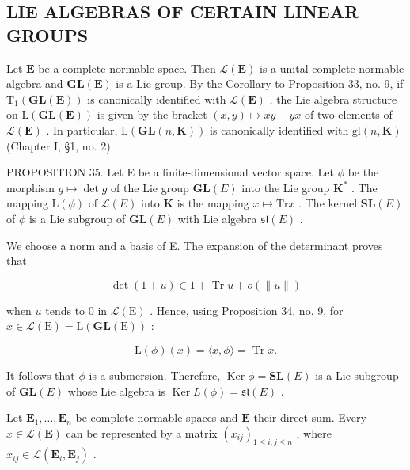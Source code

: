 \subsection{LIE ALGEBRAS OF CERTAIN LINEAR GROUPS}

Let \(\mathbf{E}\) be a complete normable space. Then \(\mathcal{L}(\mathbf{E})\) is a unital complete normable algebra and \(\mathbf{GL}(\mathbf{E})\) is a Lie group. By the Corollary to Proposition 33, no. 9, if \(\mathrm{T}_{1}(\mathbf{GL}(\mathbf{E}))\) is canonically identified with \(\mathcal{L}(\mathbf{E})\) , the Lie algebra structure on \(\mathrm{L}(\mathbf{GL}(\mathbf{E}))\) is given by the bracket \((x,y)\mapsto xy - yx\) of two elements of \(\mathcal{L}(\mathbf{E})\) . In particular, \(\mathrm{L}(\mathbf{GL}(n,\mathbf{K}))\) is canonically identified with \(\mathrm{gl}(n,\mathbf{K})\) (Chapter I, §1, no. 2).

PROPOSITION 35. Let E be a finite-dimensional vector space. Let \(\phi\) be the morphism \(g \mapsto \det g\) of the Lie group \(\mathbf{GL}(E)\) into the Lie group \(\mathbf{K}^*\) . The mapping \(\mathrm{L}(\phi)\) of \(\mathcal{L}(E)\) into \(\mathbf{K}\) is the mapping \(x \mapsto \mathrm{Tr}x\) . The kernel \(\mathbf{SL}(E)\) of \(\phi\) is a Lie subgroup of \(\mathbf{GL}(E)\) with Lie algebra \(\mathfrak{sl}(E)\) .

We choose a norm and a basis of E. The expansion of the determinant proves that

\[
\det (1 + u) \in 1 + \operatorname{Tr} u + o (\| u \|)
\]

when \(u\) tends to 0 in \(\mathcal{L}(\mathrm{E})\) . Hence, using Proposition 34, no. 9, for \(x \in \mathcal{L}(\mathrm{E}) = \mathrm{L}(\mathbf{GL}(\mathrm{E}))\) :

\[
\mathrm{L} (\phi) (x) = \langle x, \phi \rangle = \operatorname{Tr} x.
\]

It follows that \(\phi\) is a submersion. Therefore, \(\operatorname{Ker} \phi = \mathbf{SL}(E)\) is a Lie subgroup of \(\mathbf{GL}(E)\) whose Lie algebra is \(\operatorname{Ker} L(\phi) = \mathfrak{sl}(E)\) .

Let \(\mathbf{E}_1, \ldots, \mathbf{E}_n\) be complete normable spaces and \(\mathbf{E}\) their direct sum. Every \(x \in \mathcal{L}(\mathbf{E})\) can be represented by a matrix \((x_{ij})_{1 \leqslant i, j \leqslant n}\) , where \(x_{ij} \in \mathcal{L}(\mathbf{E}_i, \mathbf{E}_j)\) .

